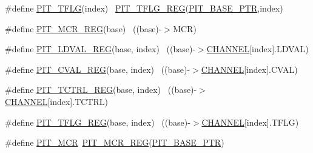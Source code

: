 \begin{DoxyCompactItemize}
\item 
\#define \hyperlink{group___p_i_t___register___accessor___macros_ga69836a5d28fbefe3eeac99190be5af1f}{P\+I\+T\+\_\+\+T\+F\+LG}(index)                                                ~\hyperlink{group___p_i_t___register___accessor___macros_ga79831c0452f96ca1b71292189ad382eb}{P\+I\+T\+\_\+\+T\+F\+L\+G\+\_\+\+R\+EG}(\hyperlink{group___p_i_t___peripheral_ga70be45f58402a8e6d2ce4df7b23aa41c}{P\+I\+T\+\_\+\+B\+A\+S\+E\+\_\+\+P\+TR},index)
\item 
\#define \hyperlink{group___p_i_t___register___accessor___macros_ga557d2712a651961dcd5ffc4f04673239}{P\+I\+T\+\_\+\+M\+C\+R\+\_\+\+R\+EG}(base)                                            ~((base)-\/$>$M\+CR)
\item 
\#define \hyperlink{group___p_i_t___register___accessor___macros_ga2fe8b64df48316de72596736de1bbb00}{P\+I\+T\+\_\+\+L\+D\+V\+A\+L\+\_\+\+R\+EG}(base,  index)                            ~((base)-\/$>$\hyperlink{samr21__xpro_200std__low__power__mode_200std__low__power__mode_8c_ace6a11e892466500d47d1f45f042bc53}{C\+H\+A\+N\+N\+EL}\mbox{[}index\mbox{]}.L\+D\+V\+AL)
\item 
\#define \hyperlink{group___p_i_t___register___accessor___macros_ga0513f6bb6550d10e2877f1918dfdc80e}{P\+I\+T\+\_\+\+C\+V\+A\+L\+\_\+\+R\+EG}(base,  index)                              ~((base)-\/$>$\hyperlink{samr21__xpro_200std__low__power__mode_200std__low__power__mode_8c_ace6a11e892466500d47d1f45f042bc53}{C\+H\+A\+N\+N\+EL}\mbox{[}index\mbox{]}.C\+V\+AL)
\item 
\#define \hyperlink{group___p_i_t___register___accessor___macros_ga4c2f72ad95fb4104612b319ce7a7d4d9}{P\+I\+T\+\_\+\+T\+C\+T\+R\+L\+\_\+\+R\+EG}(base,  index)                            ~((base)-\/$>$\hyperlink{samr21__xpro_200std__low__power__mode_200std__low__power__mode_8c_ace6a11e892466500d47d1f45f042bc53}{C\+H\+A\+N\+N\+EL}\mbox{[}index\mbox{]}.T\+C\+T\+RL)
\item 
\#define \hyperlink{group___p_i_t___register___accessor___macros_ga79831c0452f96ca1b71292189ad382eb}{P\+I\+T\+\_\+\+T\+F\+L\+G\+\_\+\+R\+EG}(base,  index)                              ~((base)-\/$>$\hyperlink{samr21__xpro_200std__low__power__mode_200std__low__power__mode_8c_ace6a11e892466500d47d1f45f042bc53}{C\+H\+A\+N\+N\+EL}\mbox{[}index\mbox{]}.T\+F\+LG)
\item 
\#define \hyperlink{group___p_i_t___register___accessor___macros_gad6118acee6a1de4d21ceaae97156642b}{P\+I\+T\+\_\+\+M\+CR}~\hyperlink{group___p_i_t___register___accessor___macros_ga557d2712a651961dcd5ffc4f04673239}{P\+I\+T\+\_\+\+M\+C\+R\+\_\+\+R\+EG}(\hyperlink{group___p_i_t___peripheral_ga70be45f58402a8e6d2ce4df7b23aa41c}{P\+I\+T\+\_\+\+B\+A\+S\+E\+\_\+\+P\+TR})

\end{DoxyCompactItemize}
